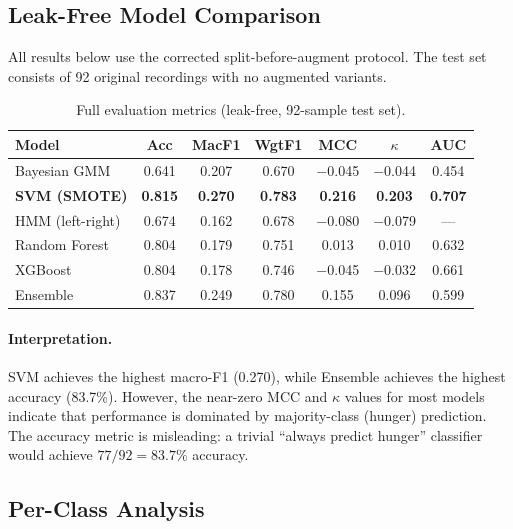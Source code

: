 \documentclass[11pt,a4paper]{article}
\begin{document}
\subsection{Leak-Free Model Comparison}

All results below use the corrected split-before-augment protocol.
The test set consists of 92 original recordings with no augmented
variants.

\begin{table}[H]
\centering
\caption{Full evaluation metrics (leak-free, 92-sample test set).}
\label{tab:results_full}
\begin{tabular}{lcccccc}
\toprule
\textbf{Model} & \textbf{Acc} & \textbf{MacF1} & \textbf{WgtF1} & \textbf{MCC} & \textbf{$\kappa$} & \textbf{AUC} \\
\midrule
Bayesian GMM    & 0.641 & 0.207 & 0.670 & $-$0.045 & $-$0.044 & 0.454 \\
\textbf{SVM (SMOTE)} & \textbf{0.815} & \textbf{0.270} & \textbf{0.783} & \textbf{0.216} & \textbf{0.203} & \textbf{0.707} \\
HMM (left-right) & 0.674 & 0.162 & 0.678 & $-$0.080 & $-$0.079 & --- \\
Random Forest   & 0.804 & 0.179 & 0.751 & 0.013 & 0.010 & 0.632 \\
XGBoost         & 0.804 & 0.178 & 0.746 & $-$0.045 & $-$0.032 & 0.661 \\
Ensemble        & 0.837 & 0.249 & 0.780 & 0.155 & 0.096 & 0.599 \\
\bottomrule
\end{tabular}
\end{table}

\paragraph{Interpretation.}
SVM achieves the highest macro-F1 (0.270), while Ensemble achieves the
highest accuracy (83.7\%). However, the near-zero MCC and $\kappa$ values
for most models indicate that performance is dominated by majority-class
(hunger) prediction. The accuracy metric is misleading: a trivial
``always predict hunger'' classifier would achieve $77/92 = 83.7\%$
accuracy.

\subsection{Per-Class Analysis}
\end{document}
